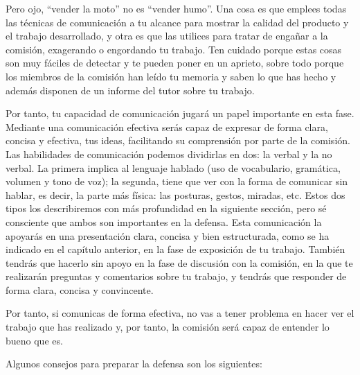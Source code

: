 Pero ojo, ``vender la moto'' no es ``vender humo''. Una cosa es que emplees todas las técnicas de comunicación a tu alcance para mostrar la calidad del producto y el trabajo desarrollado, y otra es que las utilices para tratar de engañar a la comisión, exagerando o engordando tu trabajo. Ten cuidado porque estas cosas son muy fáciles de detectar y te pueden poner en un aprieto, sobre todo porque los miembros de la comisión han leído tu memoria y saben lo que has hecho y además disponen de un informe del tutor sobre tu trabajo.

Por tanto, tu capacidad de comunicación jugará un papel importante en esta fase. Mediante una comunicación efectiva serás capaz de expresar de forma clara, concisa y efectiva, tus ideas, facilitando su comprensión por parte de la comisión. Las habilidades de comunicación podemos dividirlas en dos: la verbal y la no verbal. La primera implica al lenguaje hablado (uso de vocabulario, gramática, volumen y tono de voz); la segunda, tiene que ver con la forma de comunicar sin hablar, es decir, la parte más física: las posturas, gestos, miradas, etc. Estos dos tipos los describiremos con más profundidad en la siguiente sección, pero sé consciente que ambos son importantes en la defensa. Esta comunicación la apoyarás en una presentación clara, concisa y bien estructurada, como se ha indicado en el capítulo anterior, en la fase de exposición de tu trabajo. También tendrás que hacerlo sin apoyo en la fase de discusión con la comisión, en la que te realizarán preguntas y comentarios sobre tu trabajo, y tendrás que responder de forma clara, concisa y convincente.

Por tanto, si comunicas de forma efectiva, no vas a tener problema en hacer ver el trabajo que has realizado y, por tanto, la comisión será capaz de entender lo bueno que es. 

Algunos consejos para preparar la defensa son los siguientes:

